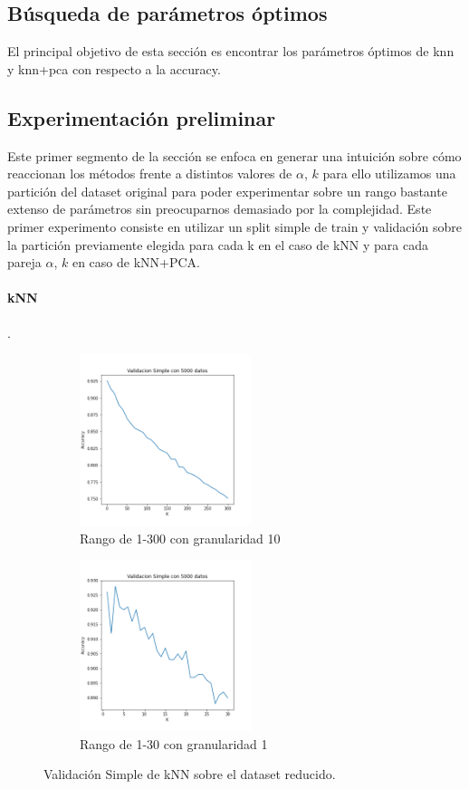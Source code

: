 
\subsection{Búsqueda de parámetros óptimos }

El principal objetivo de esta sección es encontrar los parámetros óptimos de knn y knn+pca con respecto a la accuracy. 

\subsection{Experimentación preliminar}
Este primer segmento de la sección se enfoca en generar una intuición sobre cómo reaccionan los métodos frente a distintos valores de $\alpha$, $k$ para ello utilizamos una partición del dataset original para poder experimentar sobre un rango bastante extenso de parámetros sin preocuparnos demasiado por la complejidad. Este primer experimento consiste en utilizar un split simple de train y validación sobre la partición previamente elegida para cada k en el caso de kNN y para cada pareja $\alpha$, $k$ en caso de kNN+PCA. 


\paragraph{kNN}
.
\begin{figure}[h]
\begin{subfigure}{0.5\textwidth}
\includegraphics[width=0.9\linewidth, height=5cm]{images/validacionSimple_knnsolo.png} 
\caption{Rango de 1-300 con granularidad 10}
\label{fig:subimbar_medio1}
\end{subfigure}
\begin{subfigure}{0.5\textwidth}
\includegraphics[width=0.9\linewidth, height=5cm]{images/validacionSimple_knnsolo_Kchicos.png} 
\caption{Rango de 1-30 con granularidad 1}
\label{fig:subimbar_medio2}
\end{subfigure}
\caption{Validación Simple de kNN sobre el dataset reducido.}
\label{knn_preliminar}%
\end{figure}

